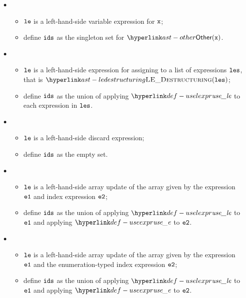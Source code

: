 \ProseParagraph
\OneApplies
\begin{itemize}
  \item {}
  \begin{itemize}
    \item $\texttt{le}$ is a left-hand-side variable expression for $\texttt{x}$;
    \item define $\texttt{ids}$ as the singleton set for $\Other(\vx)$.
  \end{itemize}

  \item {}
  \begin{itemize}
    \item $\texttt{le}$ is a left-hand-side expression for assigning to a list of expressions $\texttt{les}$,
          that is $\LEDestructuring(\vles)$;
    \item define $\texttt{ids}$ as the union of applying $\uselexpr$ to each expression in $\texttt{les}$.
  \end{itemize}

  \item {}
  \begin{itemize}
    \item $\texttt{le}$ is a left-hand-side discard expression;
    \item define $\texttt{ids}$ as the empty set.
  \end{itemize}

  \item {}
  \begin{itemize}
    \item $\texttt{le}$ is a left-hand-side array update of the array given by the expression $\texttt{e1}$ and index expression $\texttt{e2}$;
    \item define $\texttt{ids}$ as the union of applying $\uselexpr$ to $\texttt{e1}$ and applying $\useexpr$ to $\texttt{e2}$.
  \end{itemize}

  \item {}
  \begin{itemize}
    \item $\texttt{le}$ is a left-hand-side array update of the array given by the expression $\texttt{e1}$ and
          the enumeration-typed index expression $\texttt{e2}$;
    \item define $\texttt{ids}$ as the union of applying $\uselexpr$ to $\texttt{e1}$ and applying $\useexpr$ to $\texttt{e2}$.
  \end{itemize}


\end{itemize}
